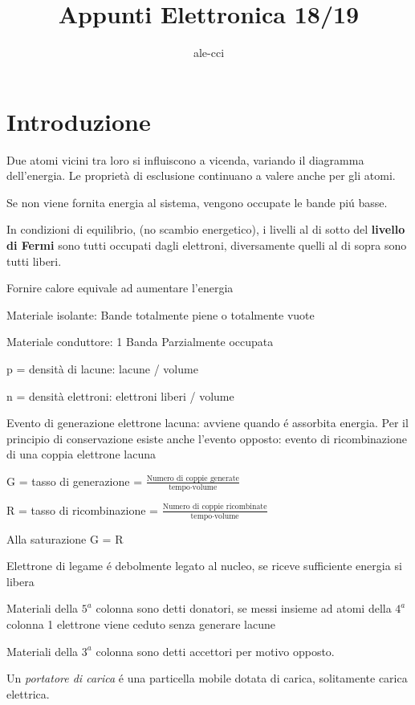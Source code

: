 \documentclass{article}
\author{ale-cci}
\title{Appunti Elettronica 18/19}
\begin{document}
\maketitle{}
\tableofcontents{}
\newpage


\section{Introduzione}
Due atomi vicini tra loro si influiscono a vicenda, variando il diagramma dell'energia.
Le proprietà di esclusione continuano a valere anche per gli atomi.

Se non viene fornita energia al sistema, vengono occupate le bande pi\'u basse.

In condizioni di equilibrio, (no scambio energetico), i livelli al di sotto del \textbf{livello di Fermi} sono tutti occupati dagli elettroni, diversamente quelli al di sopra sono tutti liberi.

Fornire calore equivale ad aumentare l'energia

Materiale isolante: Bande totalmente piene o totalmente vuote

Materiale conduttore: 1 Banda Parzialmente occupata

p = densità di lacune: lacune / volume

n = densità elettroni: elettroni liberi / volume


Evento di generazione elettrone lacuna: avviene quando \'e assorbita energia. Per il principio di conservazione esiste anche l'evento opposto: evento di ricombinazione di una coppia elettrone lacuna


G = tasso di generazione = $\frac{\text{Numero di coppie generate}}{\text{tempo}\cdot\text{volume}}$

R = tasso di ricombinazione = $\frac{\text{Numero di coppie ricombinate}}{\text{tempo}\cdot\text{volume}}$

Alla saturazione G = R


Elettrone di legame \'e debolmente legato al nucleo, se riceve sufficiente energia si libera

Materiali della $5^a$ colonna sono detti donatori, se messi insieme ad atomi della $4^a$ colonna 1 elettrone viene ceduto senza generare lacune

Materiali della $3^a$ colonna sono detti accettori per motivo opposto.

Un \textit{portatore di carica} \'e una particella mobile dotata di carica, solitamente carica elettrica.
\end{document}
